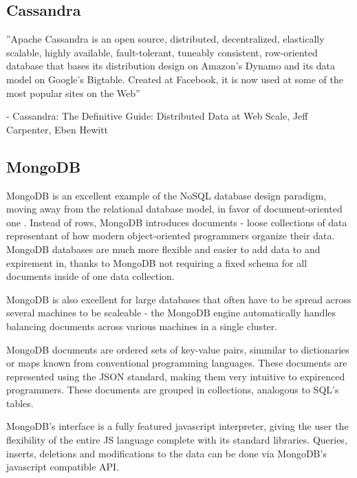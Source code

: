\subsection{Cassandra}
\label{subsec:background:second_section:first_subsection}
\begin{center}
''Apache Cassandra is an open source, distributed, decentralized, elastically scalable, highly available, fault-tolerant, tuneably consistent, row-oriented database that bases its distribution design on Amazon's Dynamo and its data model on Google's Bigtable. Created at Facebook, it is now used at some of the most popular sites on the Web''
\par - Cassandra: The Definitive Guide: Distributed Data at Web Scale, Jeff Carpenter, Eben Hewitt
\end{center}

\subsection{MongoDB}
\label{subsec:background:second_section:second_subsection}
\par MongoDB is an excellent example of the NoSQL database design paradigm, moving away from the relational database model, in favor of document-oriented one \citep{mongoDB}. Instead of rows, MongoDB introduces documents - loose collections of data representant of how modern object-oriented programmers organize their data. MongoDB databases are much more flexible and easier to add data to and expirement in, thanks to MongoDB not requiring a fixed schema for all documents inside of one data collection.
%
\par MongoDB is also excellent for large databases that often have to be spread across several machines to be scaleable - the MongoDB engine automatically handles balancing documents across various machines in a single cluster. 

\par MongoDB documents are ordered sets of key-value pairs, simmilar to dictionaries or maps known from conventional programming languages. These documents are represented using the JSON standard, making them very intuitive to expirenced programmers. These documents are grouped in collections, analogous to SQL's tables. 

\par MongoDB's interface is a fully featured javascript interpreter, giving the user the flexibility of the entire JS language complete with its standard libraries. Queries, inserts, deletions and modifications to the data can be done via MongoDB's javascript compatible API.

